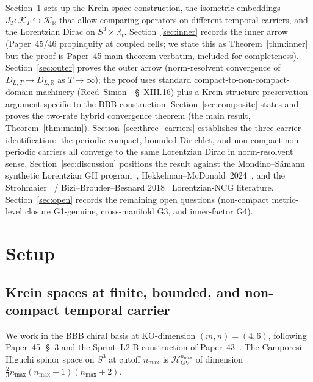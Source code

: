 \documentclass[11pt,a4paper]{article}
\theoremstyle{plain}
\theoremstyle{definition}
\newcommand{\nmax}{n_{\max}}
\newcommand{\sthree}{S^{3}}
\newcommand{\Krein}{\mathcal{K}}
\newcommand{\R}{\mathbb{R}}
\newcommand{\DLR}{D_{L,\R}}
\newcommand{\DLT}{D_{L,T}}
\newcommand{\JT}{\widetilde{J}_{T}}
\newcommand{\HGV}{\mathcal{H}_{\mathrm{GV}}}
\begin{document}
Section~\ref{sec:setup} sets up the Krein-space construction, the
isometric embeddings $\JT : \Krein_{T} \hookrightarrow \Krein_{\R}$
that allow comparing operators on different temporal carriers, and the
Lorentzian Dirac on $\sthree\times\R_{t}$. Section~\ref{sec:inner}
records the inner arrow (Paper~45/46 propinquity at coupled cells; we
state this as Theorem~\ref{thm:inner} but the proof is Paper~45 main
theorem verbatim, included for completeness).
Section~\ref{sec:outer} proves the outer arrow (norm-resolvent
convergence of $\DLT \to \DLR$ as $T\to\infty$); the proof uses standard
compact-to-non-compact-domain machinery
(Reed--Simon~\cite{reed_simon_iv}~\S~XIII.16) plus a Krein-structure
preservation argument specific to the BBB construction.
Section~\ref{sec:composite} states and proves the two-rate hybrid
convergence theorem (the main result, Theorem~\ref{thm:main}).
Section~\ref{sec:three_carriers} establishes the three-carrier
identification:\ the periodic compact, bounded Dirichlet, and
non-compact non-periodic carriers all converge to the same Lorentzian
Dirac in norm-resolvent sense.
Section~\ref{sec:discussion} positions the result against the
Mondino--S\"amann synthetic Lorentzian GH
program~\cite{mondino_samann2025},
Hekkelman--McDonald~2024~\cite{hekkelman_mcdonald2024}, and the
Strohmaier~\cite{strohmaier2006} / Bizi--Brouder--Besnard
2018~\cite{bizi_brouder_besnard2018} Lorentzian-NCG literature.
Section~\ref{sec:open} records the remaining open questions
(non-compact metric-level closure G1-genuine, cross-manifold G3, and
inner-factor G4).

\section{Setup}\label{sec:setup}

\subsection{Krein spaces at finite, bounded, and non-compact temporal
carrier}\label{sec:setup_krein}

We work in the BBB chiral basis at KO-dimension $(m, n) = (4, 6)$,
following Paper~45~\cite{paper45}\,\S~3 and the Sprint~L2-B construction
of Paper~43~\cite{paper43}. The Camporesi--Higuchi spinor space on
$\sthree$ at cutoff $\nmax$ is
$\HGV^{\nmax}$ of dimension $\frac{2}{3}\nmax(\nmax+1)(\nmax+2)$.
\end{document}
